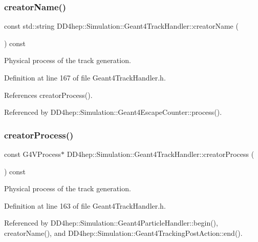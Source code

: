 \subsubsection{\texorpdfstring{creator\+Name()}{creatorName()}}
{\footnotesize\ttfamily const std\+::string D\+D4hep\+::\+Simulation\+::\+Geant4\+Track\+Handler\+::creator\+Name (\begin{DoxyParamCaption}{ }\end{DoxyParamCaption}) const\hspace{0.3cm}{\ttfamily [inline]}}



Physical process of the track generation. 



Definition at line 167 of file Geant4\+Track\+Handler.\+h.



References creator\+Process().



Referenced by D\+D4hep\+::\+Simulation\+::\+Geant4\+Escape\+Counter\+::process().

\hypertarget{class_d_d4hep_1_1_simulation_1_1_geant4_track_handler_ae081ca27887a7aa012bd2df5b7eb5b98}{}\label{class_d_d4hep_1_1_simulation_1_1_geant4_track_handler_ae081ca27887a7aa012bd2df5b7eb5b98} 
\subsubsection{\texorpdfstring{creator\+Process()}{creatorProcess()}}
{\footnotesize\ttfamily const G4\+V\+Process$\ast$ D\+D4hep\+::\+Simulation\+::\+Geant4\+Track\+Handler\+::creator\+Process (\begin{DoxyParamCaption}{ }\end{DoxyParamCaption}) const\hspace{0.3cm}{\ttfamily [inline]}}



Physical process of the track generation. 



Definition at line 163 of file Geant4\+Track\+Handler.\+h.



Referenced by D\+D4hep\+::\+Simulation\+::\+Geant4\+Particle\+Handler\+::begin(), creator\+Name(), and D\+D4hep\+::\+Simulation\+::\+Geant4\+Tracking\+Post\+Action\+::end().


